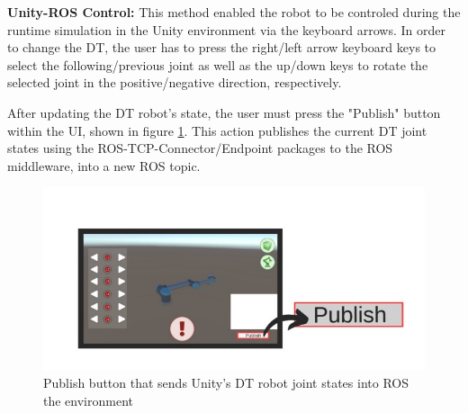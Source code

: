

    \textbf{Unity-ROS Control:} This method enabled the robot to be controled during the runtime simulation in the Unity environment via the keyboard arrows. In order to change the \ac{DT}, the user has to press the right/left arrow keyboard keys to select the following/previous joint as well as the up/down keys to rotate the selected joint in the positive/negative direction, respectively.
         
    After updating the \ac{DT} robot's state, the user must press the "Publish" button within the \ac{UI}, shown in figure \ref{fig:publish_UI_button}. This action publishes the current \ac{DT} joint states using the \ac{ROS}-\ac{TCP}-Connector/Endpoint packages to the \ac{ROS} middleware, into a new \ac{ROS} topic. 

    \begin{figure}[htpb]
        \centering
        \includegraphics[width=0.9\linewidth]{figs/publish.jpeg}
        \caption{Publish button that sends Unity's \ac{DT} robot joint states into ROS the environment}
        \label{fig:publish_UI_button}
    \end{figure}
    
